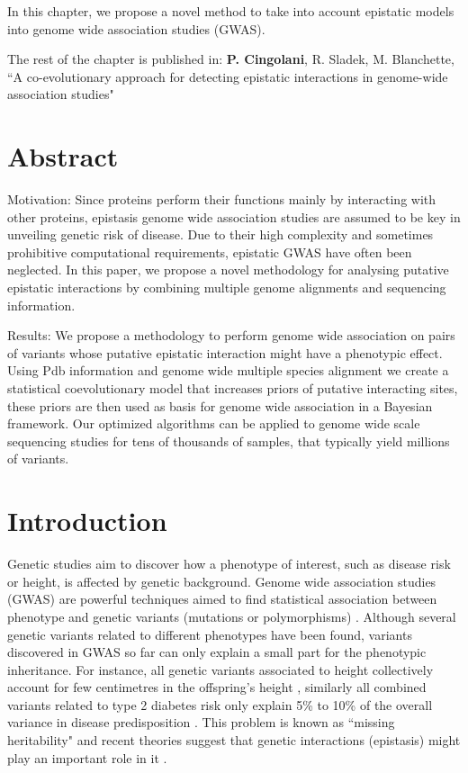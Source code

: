 In this chapter, we propose a novel method to take into account epistatic models into genome wide association studies (GWAS).

The rest of the chapter is published in: \textbf{P. Cingolani}, R. Sladek, M. Blanchette, ``A co-evolutionary approach for detecting epistatic interactions in genome-wide association studies"

\section{Abstract}

Motivation: Since proteins perform their functions mainly by interacting with other proteins, epistasis genome wide association studies are assumed to be key in unveiling genetic risk of disease. Due to their high complexity and sometimes prohibitive computational requirements, epistatic GWAS have often been neglected. In this paper, we propose a novel methodology for analysing putative epistatic interactions by combining multiple genome alignments and sequencing information. 

Results: We propose a methodology to perform genome wide association on pairs of variants whose putative epistatic interaction might have a phenotypic effect. Using Pdb information and genome wide multiple species alignment we create a statistical coevolutionary model that increases priors of putative interacting sites, these priors are then used as basis for genome wide association in a Bayesian framework. Our optimized algorithms can be applied to genome wide scale sequencing studies for tens of thousands of samples, that typically yield millions of variants.

\section{Introduction}

Genetic studies aim to discover how a phenotype of interest, such as disease risk or height, is affected by genetic background. Genome wide association studies (GWAS) are powerful techniques aimed to find statistical association between phenotype and genetic variants (mutations or polymorphisms) \cite{clarke2011basic}. Although several genetic variants related to different phenotypes have been found, variants discovered in GWAS so far can only explain a small part for the phenotypic inheritance. For instance, all genetic variants associated to height collectively account for few centimetres in the offspring's height \cite{wood2014defining}, similarly all combined variants related to type 2 diabetes risk only explain 5\% to 10\% of the overall variance in disease predisposition \cite{morris2012large, consortium2014genome}. This problem is known as “missing heritability" \cite{manolio2009finding} and recent theories suggest that genetic interactions (epistasis) might play an important role in it \cite{zuk2012mystery, zuk2014searching}.

